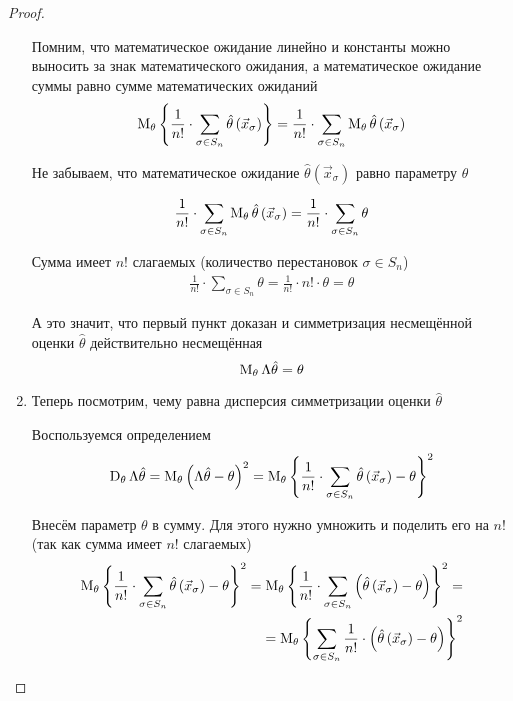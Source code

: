 \begin{proof}
\begin{enumerate}
      Помним, что математическое ожидание линейно и
      константы можно выносить за знак математического ожидания,
      а математическое ожидание суммы равно сумме математических ожиданий
      \begin{align*}
          \operatorname{M}_{\theta} \left\{\frac{1}{n!}\cdot\sum_{\sigma\in S_n}
        \hat{\theta}\left(\vec{x}_\sigma\right)\right\}
        =\frac{1}{n!}\cdot\sum_{\sigma\in S_n}
            \operatorname{M}_{\theta} \hat{\theta}\left(\vec{x}_\sigma\right)
      \end{align*}

      Не забываем, что математическое ожидание
      $\hat{\theta}\left( \vec{x}_{\sigma} \right)$ равно параметру
      $\theta$

      \begin{align*}
          \frac{1}{n!}\cdot\sum_{\sigma\in S_n}
        \operatorname{M}_{\theta} \hat{\theta}\left(\vec{x}_\sigma\right)
        =\frac{1}{n!}\cdot\sum_{\sigma\in S_n}\theta
      \end{align*}

      Сумма имеет $n!$ слагаемых (количество перестановок $\sigma\in S_n$)
      \begin{align*}
          \frac{1}{n!}\cdot\sum_{\sigma\in S_n}\theta
        =\frac{1}{n!}\cdot n!\cdot\theta
        =\theta
      \end{align*}

      А это значит, что первый пункт доказан и симметризация
      несмещённой оценки $\hat{\theta}$ действительно несмещённая
      $$\operatorname{M}_{\theta} \Lambda\hat{\theta}=\theta$$
      \item
      Теперь посмотрим, чему равна дисперсия симметризации
      оценки $\hat{\theta}$

      Воспользуемся определением
      \begin{align*}
          \operatorname{D}_{\theta} \Lambda\hat{\theta}
        =\operatorname{M}_{\theta} 
            \left(\Lambda\hat{\theta}-\theta\right)^2
        =\operatorname{M}_{\theta} 
            \left\{\frac{1}{n!}\cdot\sum_{\sigma\in S_n}
        \hat{\theta}\left(\vec{x}_\sigma\right)
        -\theta\right\}^2
      \end{align*}

      Внесём параметр $\theta$ в сумму.
      Для этого нужно умножить и поделить его на $n!$
      (так как сумма имеет $n!$ слагаемых)
      \begin{align*}
        \operatorname{M}_{\theta} \left\{\frac{1}{n!}\cdot\sum_{\sigma\in S_n}
          \hat{\theta}\left(\vec{x}_\sigma\right)-\theta\right\}^2
        = \operatorname{M}_{\theta} 
          \left\{\frac{1}{n!}\cdot\sum_{\sigma\in S_n}
      \left(\hat{\theta}\left(\vec{x}_\sigma\right)
      -\theta\right)\right\}^2 = \\
        = \operatorname{M}_{\theta} 
          \left\{\sum_{\sigma\in S_n}\frac{1}{n!}\cdot
      \left(\hat{\theta}\left(\vec{x}_\sigma\right)
      -\theta\right)\right\}^2
      \end{align*}


\end{enumerate}
\end{proof}

